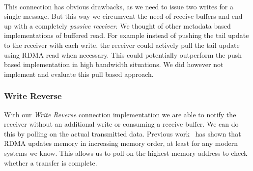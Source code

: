 \paragraph{} This connection has obvious drawbacks, as we need to issue two writes for a single message. But this way we 
circumvent the need of receive buffers and end up with a completely \emph{passive receiver}. We thought of other metadata
based implementations of buffered read. For example instead of pushing the tail update to the receiver with each write, the
receiver could actively pull the tail update using RDMA read when necessary. This could potentially outperform the push based
implementation in high bandwidth situations. We did however not implement and evaluate this pull based approach.


\subsubsection{Write Reverse}

With our \emph{Write Reverse} connection implementation we are able to notify the receiver without an additional write or
consuming a receive buffer. We can do this by polling on the actual transmitted data. Previous work~\cite{herd, farm} has
shown that RDMA updates memory in increasing memory order, at least for any modern systems we know. This allows us to poll
on the highest memory address to check whether a transfer is complete.

